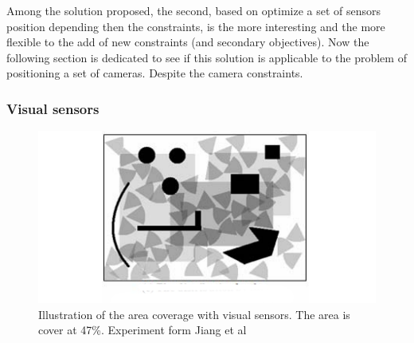 Among the solution proposed, the second, based on optimize a set of sensors position  depending then  the constraints, is the more interesting and the more flexible to the add of new constraints (and secondary objectives). 
Now the following section  is dedicated to see if this solution is applicable to the problem of positioning a set of cameras. Despite the camera constraints.

	\subsubsection{Visual sensors}
	
	\begin{figure}[t!]
	\center
{}
   \includegraphics[width=\linewidth]{img/coverage[165].png}
  \caption{ Illustration of  the  area coverage with visual sensors. The area  is cover at 47\%. Experiment form Jiang et al \citep{165*jiang2010} }\label{fig:Coverage165}
  \endminipage\hfill
\end{figure}
	
